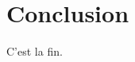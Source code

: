 \documentclass[french,nochapter,11pt]{rapportUB}
\begin{document}
\FloatBarrier

\section{Conclusion}
\label{sec:conclusion}
C'est la fin.




\end{document}
